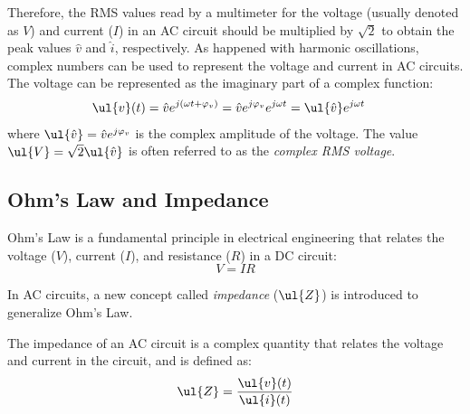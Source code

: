 Therefore, the RMS values read by a multimeter for the voltage (usually denoted as $V$) and current ($I$) in an AC circuit should be multiplied by $\sqrt{2}$ to obtain the peak values $\hat{v}$ and $\hat{i}$, respectively. As happened with harmonic oscillations, complex numbers can be used to represent the voltage and current in AC circuits. The voltage can be represented as the imaginary part of a complex function:
\begin{align*}
\ul{v}(t) &= \hat{v} e^{j(\omega t + \varphi_v)}
= \hat{v}e^{j\varphi_v} e^{j\omega t}
= \ul{\hat{v}} e^{j\omega t}
\end{align*}
where $\ul{\hat{v}} = \hat{v}e^{j\varphi_v}$ is the complex amplitude of the voltage. The value $\ul{V}=\sqrt{2}\ul{\hat{v}}$ is often referred to as the \textit{complex RMS voltage}.

\subsection{Ohm's Law and Impedance}

Ohm's Law is a fundamental principle in electrical engineering that relates the voltage ($V$), current ($I$), and resistance ($R$) in a DC circuit:
\begin{equation}
V = IR
\label{eq:ohms_law}
\end{equation}

In AC circuits, a new concept called \textit{impedance} ($\ul{Z}$) is introduced to generalize Ohm's Law.
\begin{definicion}[Impedance]
The impedance of an AC circuit is a complex quantity that relates the voltage and current in the circuit, and is defined as:
\begin{equation*}
\ul{Z} = \frac{\ul{v}(t)}{\ul{i}(t)}
\end{equation*}
\end{definicion}

